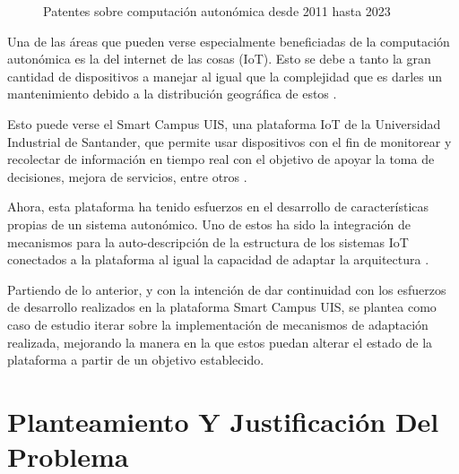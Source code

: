 \documentclass[12pt]{article}
\begin{document}
    \begin{figure}[h]
        \centering
        
        \caption{Patentes sobre computación autonómica desde 2011 hasta 2023} \cite{lens} 
        \label{fig:lens}
    \end{figure}


    Una de las áreas que pueden verse especialmente beneficiadas de la computación autonómica es la del internet de las cosas (IoT). Esto se debe a tanto la gran cantidad de dispositivos a manejar al igual que la complejidad que es darles un mantenimiento debido a la distribución geográfica de estos \cite{Tahir_2019}. 
    
    Esto puede verse el Smart Campus UIS, una plataforma IoT de la Universidad Industrial de Santander, que permite usar dispositivos con el fin de monitorear y recolectar de información en tiempo real con el objetivo de apoyar la toma de decisiones, mejora de servicios, entre otros \cite{henry_2020}.

    Ahora, esta plataforma ha tenido esfuerzos en el desarrollo de características propias de un sistema autonómico. Uno de estos ha sido la integración de mecanismos para la auto-descripción de la estructura de los sistemas IoT conectados a la plataforma al igual la capacidad de adaptar la arquitectura \cite{henry_2020}. %
    

    Partiendo de lo anterior, y con la intención de dar continuidad con los esfuerzos de desarrollo realizados en la plataforma Smart Campus UIS, se plantea como caso de estudio iterar sobre la implementación de mecanismos de adaptación realizada, mejorando la manera en la que estos puedan alterar el estado de la plataforma a partir de un objetivo establecido.  


    \section{Planteamiento Y Justificación Del Problema}
    
    
\end{document}
